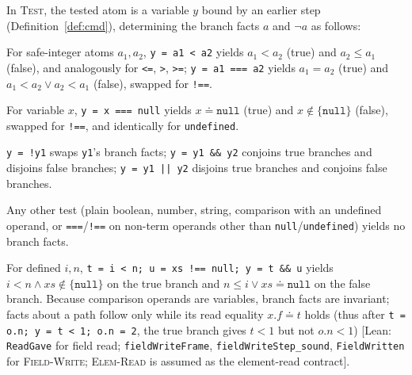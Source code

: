 \documentclass[10pt,a4paper]{article}
\theoremstyle{definition}
\theoremstyle{remark}
\newcommand{\code}[1]{\texttt{#1}}
\newcommand{\lean}[1]{\texttt{\small #1}}
\newcommand{\status}[1]{\textsf{\small[#1]}}
\begin{document}
In \textsc{Test}, the tested atom is a variable $y$ bound by an earlier
step (Definition~\ref{def:cmd}), determining the branch facts $a$ and
$\neg a$ as follows:
\begin{description}[leftmargin=1.5em,style=nextline]
\item[Numeric comparison] For safe-integer atoms $a_1,a_2$, \code{y = a1 < a2}
yields $a_1<a_2$ (true) and $a_2\le a_1$ (false), and analogously for
\code{<=}, \code{>}, \code{>=}; \code{y = a1 === a2} yields $a_1=a_2$
(true) and $a_1<a_2\vee a_2<a_1$ (false), swapped for \code{!==}.
\item[Nullish comparison] For variable $x$, \code{y = x === null} yields
$x\doteq\code{null}$ (true) and $x\notin\{\code{null}\}$ (false), swapped
for \code{!==}, and identically for \code{undefined}.
\item[Boolean connectives] \code{y = !y1} swaps \code{y1}'s branch facts;
\code{y = y1 \&\& y2} conjoins true branches and disjoins false branches;
\code{y = y1 || y2} disjoins true branches and conjoins false branches.
\item[Other tests] Any other test (plain boolean, number, string,
comparison with an undefined operand, or \code{===}/\code{!==} on
non-term operands other than \code{null}/\code{undefined}) yields no
branch facts.
\end{description}
\noindent
For defined $i,n$, \code{t = i < n; u = xs !== null; y = t \&\& u} yields
$i<n\wedge\mathit{xs}\notin\{\code{null}\}$ on the true branch and
$n\le i\vee\mathit{xs}\doteq\code{null}$ on the false branch. Because
comparison operands are variables, branch facts are invariant; facts
about a path follow only while its read equality $x.f\doteq t$ holds
(thus after \code{t = o.n; y = t < 1; o.n = 2}, the true branch gives
$t<1$ but not $o.n<1$)
\status{Lean: \lean{ReadGave} for field read; \lean{fieldWriteFrame}, \lean{fieldWriteStep\_sound}, \lean{FieldWritten} for \textsc{Field-Write}; \textsc{Elem-Read} is assumed as the element-read contract}.
\end{document}

